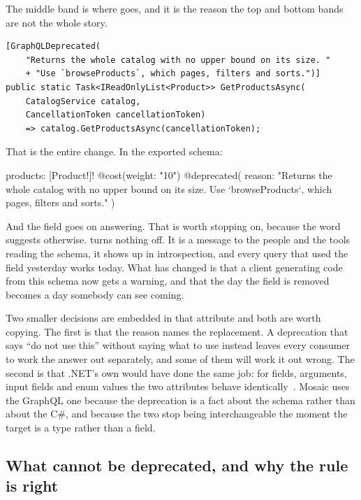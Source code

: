 %
The middle band is where  goes, and it is the reason the top and
bottom bands are not the whole story.

\begin{verbatim}
[GraphQLDeprecated(
    "Returns the whole catalog with no upper bound on its size. "
    + "Use `browseProducts`, which pages, filters and sorts.")]
public static Task<IReadOnlyList<Product>> GetProductsAsync(
    CatalogService catalog,
    CancellationToken cancellationToken)
    => catalog.GetProductsAsync(cancellationToken);
\end{verbatim}

That is the entire change. In the exported schema:

\begin{graphqlsdl}
products: [Product!]!
  @cost(weight: "10")
  @deprecated(
    reason: "Returns the whole catalog with no upper bound on its size. Use `browseProducts`, which pages, filters and sorts."
  )
\end{graphqlsdl}

%
And the field goes on answering. That is worth stopping on, because the word
suggests otherwise.  turns nothing off. It is a message to the
people and the tools reading the schema, it shows up in introspection, and every
query that used the field yesterday works today. What has changed is that a
client generating code from this schema now gets a warning, and that the day the
field is removed becomes a day somebody can see coming.

Two smaller decisions are embedded in that attribute and both are worth copying.
The first is that the reason names the replacement. A deprecation that says
\enquote{do not use this} without saying what to use instead leaves every
consumer to work the answer out separately, and some of them will work it out
wrong. The second is that .NET's own  would have done
the same job: for fields, arguments, input fields and enum values the two
attributes behave identically~\autocite{chillicream2026versioning}. Mosaic uses
the GraphQL one because the deprecation is a fact about the schema rather than
about the C\#, and because the two stop being interchangeable the moment the
target is a type rather than a field.

\subsection*{What cannot be deprecated, and why the rule is right}

